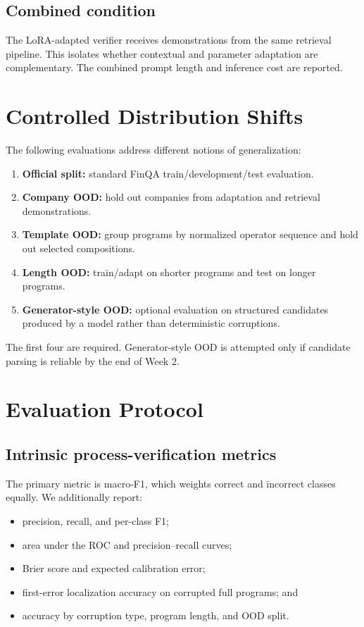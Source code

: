 \documentclass[10pt,twocolumn]{article}
\begin{document}
\subsection{Combined condition}
The LoRA-adapted verifier receives demonstrations from the same retrieval pipeline. This isolates whether contextual and parameter adaptation are complementary. The combined prompt length and inference cost are reported.

\section{Controlled Distribution Shifts}
The following evaluations address different notions of generalization:
\begin{enumerate}
  \item \textbf{Official split:} standard FinQA train/development/test evaluation.
  \item \textbf{Company OOD:} hold out companies from adaptation and retrieval demonstrations.
  \item \textbf{Template OOD:} group programs by normalized operator sequence and hold out selected compositions.
  \item \textbf{Length OOD:} train/adapt on shorter programs and test on longer programs.
  \item \textbf{Generator-style OOD:} optional evaluation on structured candidates produced by a model rather than deterministic corruptions.
\end{enumerate}
The first four are required. Generator-style OOD is attempted only if candidate parsing is reliable by the end of Week 2.

\section{Evaluation Protocol}
\subsection{Intrinsic process-verification metrics}
The primary metric is macro-F1, which weights correct and incorrect classes equally. We additionally report:
\begin{itemize}
  \item precision, recall, and per-class F1;
  \item area under the ROC and precision--recall curves;
  \item Brier score and expected calibration error;
  \item first-error localization accuracy on corrupted full programs; and
  \item accuracy by corruption type, program length, and OOD split.
\end{itemize}
\end{document}
